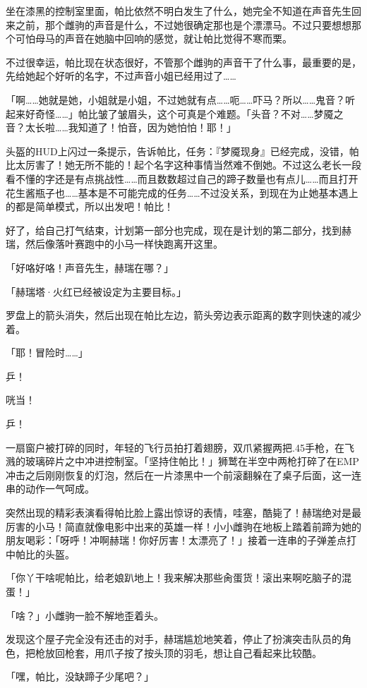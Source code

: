 坐在漆黑的控制室里面，帕比依然不明白发生了什么，她完全不知道在声音先生回来之前，那个雌驹的声音是什么，不过她很确定那也是个漂漂马。不过只要想想那个可怕母马的声音在她脑中回响的感觉，就让帕比觉得不寒而栗。

不过很幸运，帕比现在状态很好，不管那个雌驹的声音干了什么事，最重要的是，先给她起个好听的名字，不过声音小姐已经用过了……

「啊……她就是她，小姐就是小姐，不过她就有点……呃……吓马？所以……鬼音？听起来好奇怪……」帕比皱了皱眉头，这个可真是个难题。「头音？不对……梦魇之音？太长啦……我知道了！怕音，因为她怕怕！耶！」

头盔的HUD上闪过一条提示，告诉帕比，任务：『梦魇现身』已经完成，没错，帕比太厉害了！她无所不能的！起个名字这种事情当然难不倒她。不过这么老长一段看不懂的字还是有点挑战性……而且数数超过自己的蹄子数量也有点儿……而且打开花生酱瓶子也……基本是不可能完成的任务……不过没关系，到现在为止她基本遇上的都是简单模式，所以出发吧！帕比！

好了，给自己打气结束，计划第一部分也完成，现在是计划的第二部分，找到赫瑞，然后像落叶赛跑中的小马一样快跑离开这里。

「好咯好咯！声音先生，赫瑞在哪？」

「{\mt 赫瑞塔·火红已经被设定为主要目标。}」

罗盘上的箭头消失，然后出现在帕比左边，箭头旁边表示距离的数字则快速的减少着。

「耶！冒险时……」

乒！

咣当！

乒！

一扇窗户被打碎的同时，年轻的飞行员拍打着翅膀，双爪紧握两把.45手枪，在飞溅的玻璃碎片之中冲进控制室。「坚持住帕比！」狮鹫在半空中两枪打碎了在EMP冲击之后刚刚恢复的灯泡，然后在一片漆黑中一个前滚翻躲在了桌子后面，这一连串的动作一气呵成。

突然出现的精彩表演看得帕比脸上露出惊讶的表情，哇塞，酷毙了！赫瑞绝对是最厉害的小马！简直就像电影中出来的英雄一样！小小雌驹在地板上踏着前蹄为她的朋友喝彩：「呀呼！冲啊赫瑞！你好厉害！太漂亮了！」接着一连串的子弹差点打中帕比的头盔。

「你丫干啥呢帕比，给老娘趴地上！我来解决那些肏蛋货！滚出来啊吃脑子的混蛋！」

「啥？」小雌驹一脸不解地歪着头。

发现这个屋子完全没有还击的对手，赫瑞尴尬地笑着，停止了扮演突击队员的角色，把枪放回枪套，用爪子按了按头顶的羽毛，想让自己看起来比较酷。

「嘿，帕比，没缺蹄子少尾吧？」

